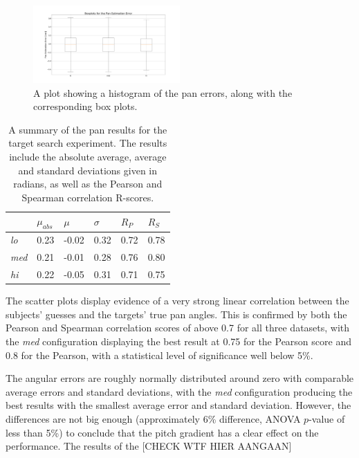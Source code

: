 \documentclass[format=sigconf, review=true, screen=true, anonymous=true]{acmart}
\begin{document}
\begin{figure}
  \centering
  \includegraphics[width=0.5\textwidth]{figures/pan_err_boxplot.png}
  \caption{A plot showing a histogram of the pan errors, along with the corresponding box plots. }
  \label{fig:pan-err-boxplots}
\end{figure}

\begin{table}
  \centering
  \caption{A summary of the pan results for the target search experiment. The results include the absolute average, average and standard deviations given in radians, as well as the Pearson and Spearman correlation R-scores.}
  \label{tab:pan-results}
  \begin{tabular}{|l|l|l|l|l|l|}
    \hline
    & $\mu_{abs}$ & $\mu$ & $\sigma$ & $R_{P}$ & $R_{S}$ \\\hline\hline
    \emph{lo}  & 0.23 & -0.02 & 0.32 & 0.72 & 0.78 \\\hline
    \emph{med} & 0.21 & -0.01 & 0.28 & 0.76 & 0.80 \\\hline
    \emph{hi}  & 0.22 & -0.05 & 0.31 & 0.71 & 0.75 \\\hline
  \end{tabular}
\end{table}

The scatter plots display evidence of a very strong linear correlation between the subjects' guesses and the targets' true pan angles. This is confirmed by both the Pearson and Spearman correlation scores of above 0.7 for all three datasets, with the \emph{med} configuration displaying the best result at 0.75 for the Pearson score and 0.8 for the Pearson, with a statistical level of significance well below 5\%. 

The angular errors are roughly normally distributed around zero with comparable average errors and standard deviations, with the \emph{med} configuration producing the best results with the smallest average error and standard deviation. However, the differences are not big enough (approximately 6\% difference, ANOVA $p$-value of less than 5\%) to conclude that the pitch gradient has a clear effect on the performance. The results of the 
[CHECK WTF HIER AANGAAN]
\end{document}
